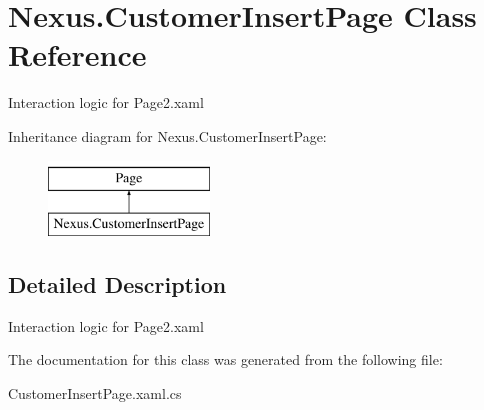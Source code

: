 \hypertarget{class_nexus_1_1_customer_insert_page}{}\section{Nexus.\+Customer\+Insert\+Page Class Reference}
\label{class_nexus_1_1_customer_insert_page}


Interaction logic for Page2.\+xaml  


Inheritance diagram for Nexus.\+Customer\+Insert\+Page\+:\begin{figure}[H]
\begin{center}
\leavevmode
\includegraphics[height=2.000000cm]{class_nexus_1_1_customer_insert_page}
\end{center}
\end{figure}


\subsection{Detailed Description}
Interaction logic for Page2.\+xaml 



The documentation for this class was generated from the following file\+:\begin{DoxyCompactItemize}
\item 
Customer\+Insert\+Page.\+xaml.\+cs\end{DoxyCompactItemize}
